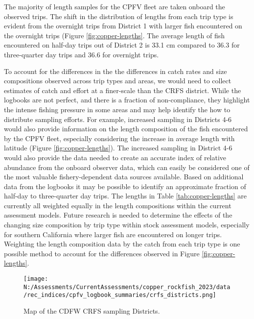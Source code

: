 \documentclass[11pt,
  english,
  letterpaper,
]{article}
\begin{document}
The majority of length samples for the CPFV fleet are taken onboard the observed trips. The shift in the distribution of lengths from each trip type is evident from the overnight trips from District 1 with larger fish encountered on the overnight trips (Figure \ref{fig:copper-lengths}. The average length of fish encountered on half-day trips out of District 2 is 33.1 cm compared to 36.3 for three-quarter day trips and 36.6 for overnight trips.

To account for the differences in the the differences in catch rates and size compositions observed across trip types and areas, we would need to collect estimates of catch and effort at a finer-scale than the CRFS district. While the logbooks are not perfect, and there is a fraction of non-compliance, they highlight the intense fishing pressure in some areas and may help identify the how to distribute sampling efforts. For example, increased sampling in Districts 4-6 would also provide information on the length composition of the fish encountered by the CPFV fleet, especially considering the increase in average length with latitude (Figure \ref{fig:copper-lengths}). The increased sampling in District 4-6 would also provide the data needed to create an accurate index of relative abundance from the onboard observer data, which can easily be considered one of the most valuable fishery-dependent data sources available. Based on additional data from the logbooks it may be possible to identify an approximate fraction of half-day to three-quarter day trips. The lengths in Table \ref{tab:copper-lengths} are currently all weighted equally in the length compositions within the current assessment models. Future research is needed to determine the effects of the changing size composition by trip type within stock assessment models, especially for southern California where larger fish are encountered on longer trips. Weighting the length composition data by the catch from each trip type is one possible method to account for the differences observed in Figure \ref{fig:copper-lengths}.

\newpage

\begin{figure}
\centering
\texttt{[image: N:/Assessments/CurrentAssessments/copper\_rockfish\_2023/data/rec\_indices/cpfv\_logbook\_summaries/crfs\_districts.png]}
\caption{Map of the CDFW CRFS sampling Districts.\label{fig:crfs-districts}}
\end{figure}

\pagebreak
\end{document}
